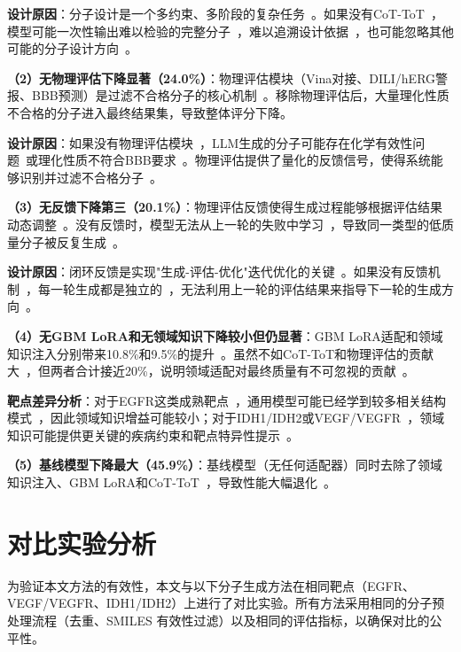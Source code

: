 \textbf{设计原因}：分子设计是一个多约束、多阶段的复杂任务~\cite{Zhou2019Exp}。如果没有CoT-ToT~\cite{Wei2022,Yao2023}，模型可能一次性输出难以检验的完整分子~\cite{Wei2022}，难以追溯设计依据~\cite{Wei2022}，也可能忽略其他可能的分子设计方向~\cite{Yao2023}。

\textbf{（2）无物理评估下降显著（24.0\%）}：物理评估模块（Vina对接、DILI/hERG警报、BBB预测）是过滤不合格分子的核心机制~\cite{Trott2010,Aronov2008}。移除物理评估后，大量理化性质不合格的分子进入最终结果集，导致整体评分下降。

\textbf{设计原因}：如果没有物理评估模块~\cite{Trott2010}，LLM生成的分子可能存在化学有效性问题~\cite{Bagal2021}或理化性质不符合BBB要求~\cite{Pardridge2012}。物理评估提供了量化的反馈信号，使得系统能够识别并过滤不合格分子~\cite{Trott2010}。

\textbf{（3）无反馈下降第三（20.1\%）}：物理评估反馈使得生成过程能够根据评估结果动态调整~\cite{Yao2023}。没有反馈时，模型无法从上一轮的失败中学习~\cite{Yao2023}，导致同一类型的低质量分子被反复生成~\cite{Yao2023}。

\textbf{设计原因}：闭环反馈是实现"生成-评估-优化"迭代优化的关键~\cite{Yao2023}。如果没有反馈机制~\cite{Yao2023}，每一轮生成都是独立的~\cite{Yao2023}，无法利用上一轮的评估结果来指导下一轮的生成方向~\cite{Yao2023}。

\textbf{（4）无GBM LoRA和无领域知识下降较小但仍显著}：GBM LoRA适配和领域知识注入分别带来10.8\%和9.5\%的提升~\cite{hu2022lora}。虽然不如CoT-ToT和物理评估的贡献大~\cite{hu2022lora}，但两者合计接近20\%，说明领域适配对最终质量有不可忽视的贡献~\cite{hu2022lora}。

\textbf{靶点差异分析}：对于EGFR这类成熟靶点~\cite{Fu2025}，通用模型可能已经学到较多相关结构模式~\cite{Fu2025}，因此领域知识增益可能较小；对于IDH1/IDH2或VEGF/VEGFR~\cite{Fu2025}，领域知识可能提供更关键的疾病约束和靶点特异性提示~\cite{Fu2025}。

\textbf{（5）基线模型下降最大（45.9\%）}：基线模型（无任何适配器）同时去除了领域知识注入、GBM LoRA和CoT-ToT~\cite{hu2022lora}，导致性能大幅退化~\cite{hu2022lora}。

\section{对比实验分析}\label{sec:comparison}

为验证本文方法的有效性，本文与以下分子生成方法在相同靶点（EGFR、VEGF/VEGFR、IDH1/IDH2）上进行了对比实验。所有方法采用相同的分子预处理流程（去重、SMILES 有效性过滤）以及相同的评估指标，以确保对比的公平性。

